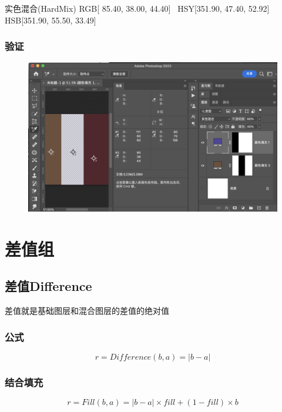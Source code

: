 \begin{result}
\item 实色混合(HardMix)       RGB[ 85.40,  38.00,  44.40]~ HSY[351.90,  47.40,  52.92]~ HSB[351.90,  55.50,  33.49]
\end{result}
\newpage
\subsection{ 验证}
\begin{figure}[h!]
	\centering
	\includegraphics[width=\linewidth]{figure/hardmix}
	\caption{}
	\label{fig:hardmix}
\end{figure}
%
%
%

\chapter{差值组}

\section{ 差值Difference}

差值就是基础图层和混合图层的差值的绝对值

\subsection{ 公式}
\begin{equation}r=Difference(b,a)=|b-a|\end{equation}
\subsection{ 结合填充}
\begin{equation}r=Fill(b,a)=|b-a|\times fill + (1-fill)\times b\end{equation}
